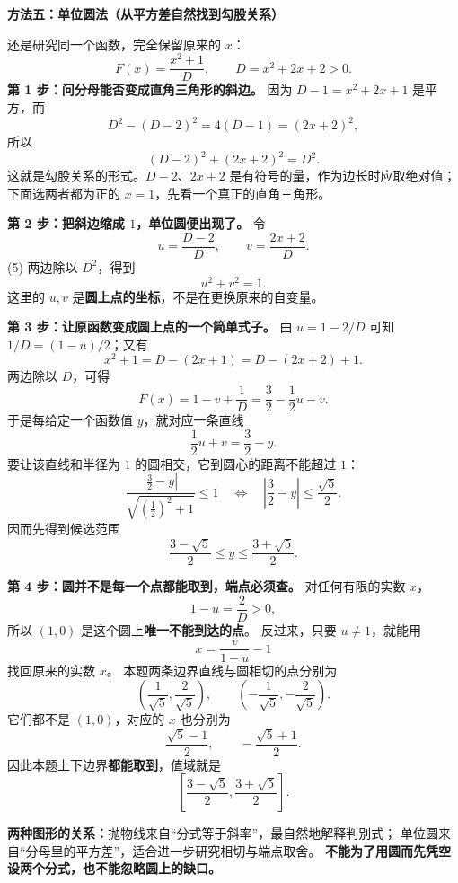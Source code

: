 \clearpage
\begin{proofbox}
  \textbf{\textcolor{CProof}{方法五：单位圆法（从平方差自然找到勾股关系）}}

  \medskip
  还是研究同一个函数，完全保留原来的 $x$：
  \[
    F(x)=\frac{x^2+1}{D},\qquad D=x^2+2x+2>0.
  \]
  \textbf{第 1 步：问分母能否变成直角三角形的斜边。}
  因为 $D-1=x^2+2x+1$ 是平方，而
  \[
    D^2-(D-2)^2=4(D-1)=(2x+2)^2,
  \]
  所以
  \[
    \boxed{(D-2)^2+(2x+2)^2=D^2.}\tag{5}
  \]
  这就是勾股关系的形式。$D-2$、$2x+2$ 是有符号的量，作为边长时应取绝对值；下面选两者都为正的 $x=1$，先看一个真正的直角三角形。
\begin{center}\end{center}


  \textbf{第 2 步：把斜边缩成 $1$，单位圆便出现了。}
  令
  \[
    u=\frac{D-2}{D},\qquad v=\frac{2x+2}{D}.
  \]
  (5) 两边除以 $D^2$，得到
  \[
    \boxed{u^2+v^2=1.}
  \]
  这里的 $u,v$ 是\textbf{圆上点的坐标}，不是在更换原来的自变量。

  \textbf{第 3 步：让原函数变成圆上点的一个简单式子。}
  由 $u=1-2/D$ 可知 $1/D=(1-u)/2$；又有
  \[
    x^2+1=D-(2x+1)=D-(2x+2)+1.
  \]
  两边除以 $D$，可得
  \[
    F(x)=1-v+\frac1D
    =\boxed{\frac32-\frac12u-v.}
  \]
  于是每给定一个函数值 $y$，就对应一条直线
  \[
    \frac12u+v=\frac32-y.
  \]
  要让该直线和半径为 $1$ 的圆相交，它到圆心的距离不能超过 $1$：
  \[
    \frac{|\frac32-y|}{\sqrt{(\frac12)^2+1}}\le1
    \quad\Longleftrightarrow\quad
    \left|\frac32-y\right|\le\frac{\sqrt5}{2}.
  \]
  因而先得到候选范围
  \[
    \frac{3-\sqrt5}{2}\le y\le\frac{3+\sqrt5}{2}.
  \]
  \begin{center}\end{center}

  \textbf{第 4 步：圆并不是每一个点都能取到，端点必须查。}
  对任何有限的实数 $x$，
  \[
    1-u=\frac2D>0,
  \]
  所以 $(1,0)$ 是这个圆上\textbf{唯一不能到达的点}。
  反过来，只要 $u\ne1$，就能用
  \[
    x=\frac{v}{1-u}-1
  \]
  找回原来的实数 $x$。
  本题两条边界直线与圆相切的点分别为
  \[
    \left(\frac1{\sqrt5},\frac2{\sqrt5}\right),\qquad
    \left(-\frac1{\sqrt5},-\frac2{\sqrt5}\right).
  \]
  它们都不是 $(1,0)$，对应的 $x$ 也分别为
  \[
    \frac{\sqrt5-1}{2},\qquad-\frac{\sqrt5+1}{2}.
  \]
  因此本题上下边界\textbf{都能取到}，值域就是
  \[
    \boxed{\left[\frac{3-\sqrt5}{2},\frac{3+\sqrt5}{2}\right].}
  \]

  \textbf{两种图形的关系：}抛物线来自“分式等于斜率”，最自然地解释判别式；
  单位圆来自“分母里的平方差”，适合进一步研究相切与端点取舍。
  \textbf{不能为了用圆而先凭空设两个分式，也不能忽略圆上的缺口。}
\end{proofbox}


